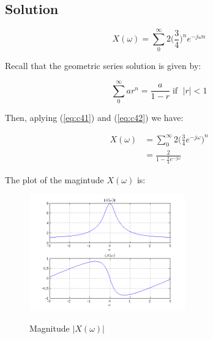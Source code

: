 \subsection*{Solution}

\begin{equation*}
X(\omega) = \displaystyle\sum_{0}^{\infty} 2\big(\frac{3}{4}\big)^n e^{-j \omega n} 
\end{equation*} 

Recall that the geometric series solution is given by:

\begin{equation}
\displaystyle\sum_0^{\infty} a r^n = \frac{a}{1-r} \; \text{if }\; |r|<1
\label{eq:c42}
\end{equation} 

Then, aplying (\ref{eq:c41}) and (\ref{eq:c42}) we have:

\begin{equation*}
\begin{aligned}
X(\omega) &= \displaystyle\sum_{0}^{\infty} 2\big(\frac{3}{4}e^{-j \omega}\big)^n  \\
&= \frac{2}{1 - \frac{3}{4}e^{-j \omega}}
\end{aligned}
\end{equation*} 

The plot of the magintude $X(\omega)$ is:

\begin{figure}[H]
\caption{Magnitude $|X(\omega)|$}
\centering
\includegraphics[width=0.6\textwidth]{figs/c4p1c.png}
\label{fig:c4p1c}
\end{figure} 

